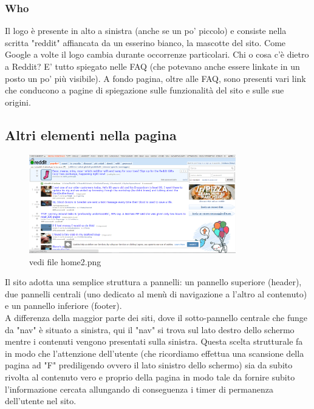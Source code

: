 \documentclass[12pt]{article}
\begin{document}
\subsubsection{Who} Il logo \`e presente in alto a sinistra (anche se un po' piccolo) e consiste nella scritta "reddit" affiancata da un esserino bianco, la mascotte del sito. Come Google a volte il logo cambia durante occorrenze particolari. Chi o cosa c'\`e dietro a Reddit? E' tutto spiegato nelle FAQ (che potevano anche essere linkate in un posto un po' pi\`u visibile). A fondo pagina, oltre alle FAQ, sono presenti vari link che conducono a pagine di spiegazione sulle funzionalit\`a del sito e sulle sue origini.
\newpage
\subsection{Altri elementi nella pagina}
\begin{figure}[ht!]
\centering
\includegraphics[width=90mm]{home2}
\caption{vedi file home2.png}
\end{figure}
Il sito adotta una semplice struttura a pannelli: un pannello superiore (header), due pannelli centrali (uno dedicato al men\`u di navigazione a l'altro al contenuto) e un pannello inferiore (footer). \\A differenza della maggior parte dei siti, dove il sotto-pannello centrale che funge da "nav" \`e situato a sinistra, qui il "nav" si trova sul lato destro dello schermo mentre i contenuti vengono presentati sulla sinistra. Questa scelta strutturale fa in modo che l'attenzione dell'utente (che ricordiamo effettua una scansione della pagina ad "F" prediligendo ovvero il lato sinistro dello schermo) sia da subito rivolta al contenuto vero e proprio della pagina in modo tale da fornire subito l'informazione cercata allungando di conseguenza i timer di permanenza dell'utente nel sito.
\end{document}
